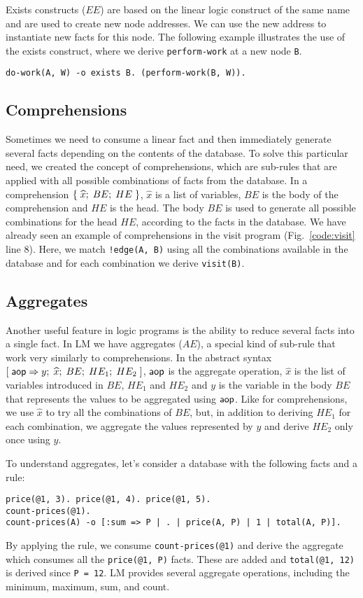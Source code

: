 Exists constructs ($EE$) are based on the linear logic construct of the same name and are used to create new node addresses.
We can use the new address to instantiate new facts for this node.  
The following example illustrates the use of the exists construct, where we derive
\texttt{perform-work} at a new node \texttt{B}.

\begin{Verbatim}
do-work(A, W) -o exists B. (perform-work(B, W)).
\end{Verbatim}


\subsection{Comprehensions}

Sometimes we need to consume a linear fact and then immediately generate several facts depending on
the contents of the database. To solve this particular need, we created the concept of comprehensions, which are
sub-rules that are applied with all possible combinations of facts from the database. In a comprehension $\{ \; \widehat{x}; \; BE; \; HE \; \}$, $\widehat{x}$ is a list of variables, $BE$ is the body of the comprehension and $HE$ is the head.
The body $BE$ is used to generate all possible combinations for the head $HE$, according to the facts
in the database.  We have already seen an example of comprehensions in the visit program (Fig.~\ref{code:visit} line 8).
Here, we match \texttt{!edge(A, B)} using all the combinations available in the database and for each combination we derive \texttt{visit(B)}.

\subsection{Aggregates}

Another useful feature in logic programs is the ability to reduce several facts into a single fact.
In LM we have aggregates ($AE$), a special kind of sub-rule that work very similarly to comprehensions.
In the abstract syntax $[\;\mathsf{aop} \Rightarrow y; \; \widehat{x}; \; BE; \; HE_1; \; HE_2 \;]$, $\mathsf{aop}$ is the aggregate operation, $\widehat{x}$ is the list of variables
introduced in $BE$, $HE_1$ and $HE_2$ and $y$ is the variable in the body
$BE$ that represents the values to be aggregated using $\mathsf{aop}$. Like for comprehensions,
we use $\widehat{x}$ to try all the combinations of $BE$, but, in addition to deriving $HE_1$ for each combination,
we aggregate the values represented by $y$ and derive $HE_2$ only once using $y$.

To understand aggregates, let's consider a database with the following facts and a rule:

\begin{Verbatim}
price(@1, 3). price(@1, 4). price(@1, 5).
count-prices(@1).
count-prices(A) -o [:sum => P | . | price(A, P) | 1 | total(A, P)].
\end{Verbatim}

By applying the rule, we consume \texttt{count-prices(@1)} and
derive the aggregate which consumes all the \texttt{price(@1, P)} facts.
These are added and \texttt{total(@1,~12)} is derived since \texttt{P~=~12}.
LM provides several aggregate operations, including the minimum, maximum, sum, and count.
